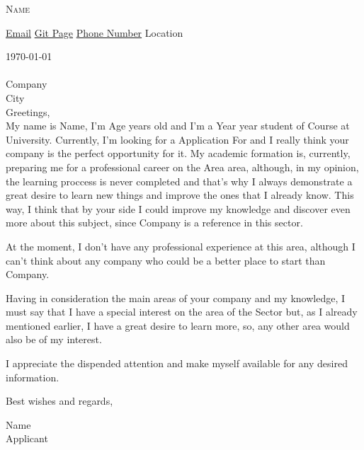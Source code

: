 \documentclass[12pt]{letter}
\newcommand{\myname}{Name}
\newcommand{\mytitle}{Applicant}
\newcommand{\myemail}{Email}
\newcommand{\mypage}{Git link}
\newcommand{\myphone}{Phone Number}
\newcommand{\mylocation}{Location}
\newcommand{\greeting}{Greetings, }
\newcommand{\closer}{Best wishes and regards, }
\newcommand{\company}{Company}
\newcommand{\city}{City}
\begin{document}
\AddToShipoutPictureBG{
\color{gr}
\AtPageUpperLeft{\rule[-1.3in]{\paperwidth}{1.3in}}
}

\begin{center}
{\fontsize{28}{0}\selectfont\scshape \myname}

\href{mailto:\myemail}{\faEnvelope\enspace \myemail}\hfill
\href{\mypage}{\faGit*\enspace Git Page}\hfill
\href{tel:\myphone}{\faPhone\enspace \myphone}\hfill
\faMapMarker\enspace \mylocation
\end{center}

\vspace{0.2in}

\today \\ 

\vspace{-0.1in}\\

\company\\ 
\city
\\ 

\vspace{-0.1in} \greeting \\

\vspace{-0.1in}\setlength\parindent{24pt}
\noident
My name is Name, I'm Age years old and I'm a Year year student of Course at University. Currently, I'm looking for a Application For and I really think your company is the perfect opportunity for it.
My academic formation is, currently, preparing me for a professional career on the Area area, although, in my opinion, the learning proccess is never completed and that's why I always demonstrate a great desire to learn new things and improve the ones that I already know.
This way, I think that by your side I could improve my knowledge and discover even more about this subject, since Company is a reference in this sector.

At the moment, I don't have any professional experience at this area, although I can't think about any company who could be a better place to start than Company.

Having in consideration the main areas of your company and my knowledge, I must say that I have a special interest on the area of the Sector but, as I already mentioned earlier, I have a great desire to learn more, so, any other area would also be of my interest.

I appreciate the dispended attention and make myself available for any desired information.

\vspace{0.1in}
\vfill

\begin{flushright}
\closer

\vspace{-0.1in}\myname\\
\mytitle
\end{flushright}
\end{document}
